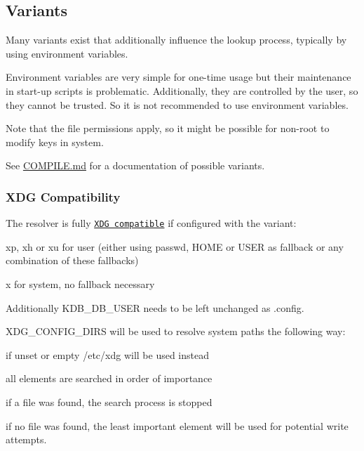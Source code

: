 \subsection*{Variants}

Many variants exist that additionally influence the lookup process, typically by using environment variables.

Environment variables are very simple for one-\/time usage but their maintenance in start-\/up scripts is problematic. Additionally, they are controlled by the user, so they cannot be trusted. So it is not recommended to use environment variables.

Note that the file permissions apply, so it might be possible for non-\/root to modify keys in system.

See \hyperlink{doc_COMPILE_md}{C\+O\+M\+P\+I\+L\+E.md} for a documentation of possible variants.

\subsubsection*{X\+D\+G Compatibility}

The resolver is fully \href{http://standards.freedesktop.org/basedir-spec/basedir-spec-latest.html}{\tt X\+D\+G compatible} if configured with the variant\+:


\begin{DoxyItemize}
\item xp, xh or xu for user (either using passwd, H\+O\+M\+E or U\+S\+E\+R as fallback or any combination of these fallbacks)
\item x for system, no fallback necessary
\end{DoxyItemize}

Additionally K\+D\+B\+\_\+\+D\+B\+\_\+\+U\+S\+E\+R needs to be left unchanged as {\ttfamily .config}.

X\+D\+G\+\_\+\+C\+O\+N\+F\+I\+G\+\_\+\+D\+I\+R\+S will be used to resolve system paths the following way\+:


\begin{DoxyItemize}
\item if unset or empty /etc/xdg will be used instead
\item all elements are searched in order of importance
\begin{DoxyItemize}
\item if a file was found, the search process is stopped
\item if no file was found, the least important element will be used for potential write attempts.
\end{DoxyItemize}
\end{DoxyItemize}

